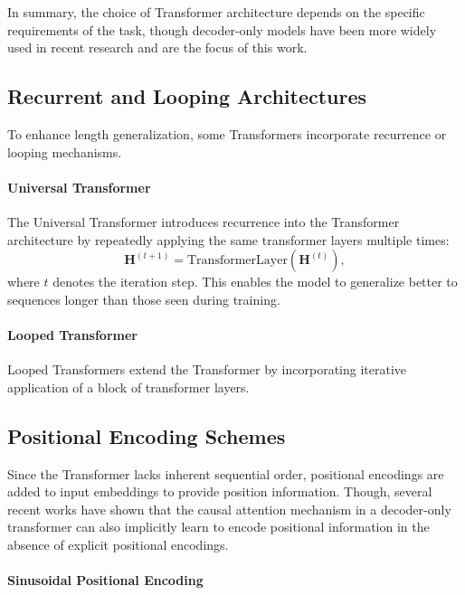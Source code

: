 In summary, the choice of Transformer architecture depends on the specific requirements of the task, though decoder-only models have been more widely used in recent research and are the focus of this work.

\subsection{Recurrent and Looping Architectures}\label{subsec:recurrent_looping}

To enhance length generalization, some Transformers incorporate recurrence or looping mechanisms.

\paragraph{Universal Transformer}

The Universal Transformer \cite{dehghani_universal_2018} introduces recurrence into the Transformer architecture by repeatedly applying the same transformer layers multiple times:
\begin{equation*}
    \mathbf{H}^{(t+1)} = \text{TransformerLayer}(\mathbf{H}^{(t)}),
\end{equation*}
where $t$ denotes the iteration step. This enables the model to generalize better to sequences longer than those seen during training.

\paragraph{Looped Transformer}

Looped Transformers \parencite{yang_looped_2023} extend the Transformer by incorporating iterative application of a block of transformer layers.

\subsection{Positional Encoding Schemes}\label{subsec:positional_encoding}

Since the Transformer lacks inherent sequential order, positional encodings are added to input embeddings to provide position information. Though, several recent works have shown that the causal attention mechanism in a decoder-only transformer can also implicitly learn to encode positional information \parencite{zuo_breaking_2024,zhou_transformers_2024} in the absence of explicit positional encodings.

\paragraph{Sinusoidal Positional Encoding}\label{subsec:sinusoidal_pos_enc}

